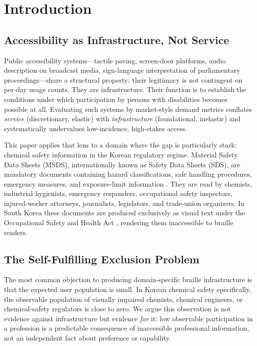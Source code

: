 \documentclass[smallextended]{svjour3}
\begin{document}
\section{Introduction}
\label{sec:introduction}

\subsection{Accessibility as Infrastructure, Not Service}

Public accessibility systems---tactile paving, screen-door platforms, audio description on broadcast media, sign-language interpretation of parliamentary proceedings---share a structural property: their legitimacy is not contingent on per-day usage counts. They are infrastructure. Their function is to establish the conditions under which participation by persons with disabilities becomes possible at all. Evaluating such systems by market-style demand metrics conflates \emph{service} (discretionary, elastic) with \emph{infrastructure} (foundational, inelastic) and systematically undervalues low-incidence, high-stakes access.

This paper applies that lens to a domain where the gap is particularly stark: chemical safety information in the Korean regulatory regime. Material Safety Data Sheets (MSDS), internationally known as Safety Data Sheets (SDS), are mandatory documents containing hazard classifications, safe handling procedures, emergency measures, and exposure-limit information \cite{kosha_act}. They are read by chemists, industrial hygienists, emergency responders, occupational safety inspectors, injured-worker attorneys, journalists, legislators, and trade-union organizers. In South Korea these documents are produced exclusively as visual text under the Occupational Safety and Health Act \cite{kosha_act}, rendering them inaccessible to braille readers.

\subsection{The Self-Fulfilling Exclusion Problem}

The most common objection to producing domain-specific braille infrastructure is that the expected user population is small. In Korean chemical safety specifically, the observable population of visually impaired chemists, chemical engineers, or chemical-safety regulators is close to zero. We argue this observation is not evidence against infrastructure but evidence \emph{for} it: low observable participation in a profession is a predictable consequence of inaccessible professional information, not an independent fact about preference or capability.
\end{document}
